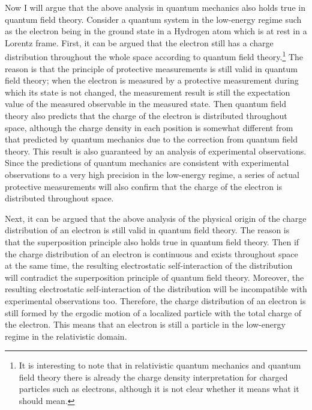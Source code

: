 Now I will argue that the above analysis in quantum mechanics also holds true in quantum field theory.
Consider a quantum system in the low-energy regime such as the electron being in the ground state in a Hydrogen atom which is at rest in a Lorentz frame.
First, it can be argued that the electron still has a charge distribution throughout the whole space according to quantum field theory.\footnote{It is interesting to note that in relativistic quantum mechanics and quantum field theory there is already the charge density interpretation for charged particles such as electrons, although it is not clear whether it means what it should mean.}
The reason is that the principle of protective measurements is still valid in quantum field theory; when the electron is measured by a protective measurement during which its state is not changed, the measurement result is still the expectation value of the measured observable in the measured state.
Then quantum field theory also predicts that the charge of the electron is distributed throughout space, although the charge density in each position is somewhat different from that predicted by quantum mechanics due to the correction from quantum field theory.
This result is also guaranteed by an analysis of experimental observations.
Since the predictions of quantum mechanics are consistent with experimental observations to a very high precision in the low-energy regime, a series of actual protective measurements will also confirm that the charge of the electron is distributed throughout space.

Next, it can be argued that the above analysis of the physical origin of the charge distribution of an electron is still valid in quantum field theory.
The reason is that the superposition principle also holds true in quantum field theory.
Then if the charge distribution of an electron is continuous and exists throughout space at the same time, the  resulting electrostatic self-interaction of the distribution will contradict the superposition principle of quantum field theory.
Moreover, the resulting electrostatic self-interaction of the distribution will be incompatible with experimental observations too.
Therefore, the charge distribution of an electron is still formed by the ergodic motion of a localized particle with the total charge of the electron.
This means that an electron is still a particle in the low-energy regime in the relativistic domain.

